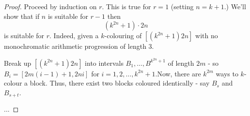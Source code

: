 \begin{proof}
  Proceed by induction on $r$.  This is true for $r = 1$ (setting $n =
  k + 1$.)  We'll show that if $n$ is suitable for $r - 1$ then
  \begin{equation}
    \label{eq:2}
    (k^{2n} + 1) \cdot 2n
  \end{equation} is suitable for $r$.  Indeed, given a $k$-colouring
  of $[(k^{2n} + 1) 2n]$ with no monochromatic arithmetic progression
  of length 3.

  Break up $[(k^{2n} + 1)2n]$ into intervals $B_{1}, \dots, B^{k^{2n}
    + 1}$ of length $2m$ - so $B_{i} = [2m(i-1)  +1, 2ni]$ for $i = 1,
  2, \dots, k^{2n} +1$.Now, there are $k^{2m}$ ways to $k$-colour a
  block. Thus, there exist two blocks coloured identically - say
  $B_{s}$ and $B_{s+t}$.  

  ...
\end{proof}

